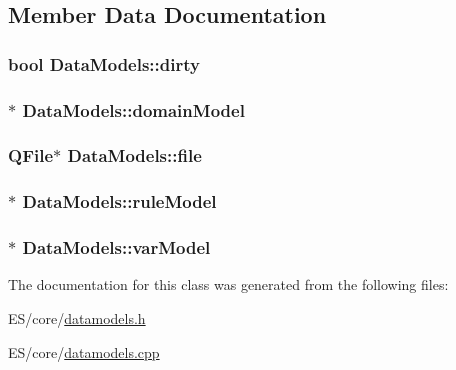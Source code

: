 \subsection{Member Data Documentation}
\hypertarget{class_data_models_a076f7de710bb0fb869f0fb438c7243ab}{
\subsubsection[{dirty}]{\setlength{\rightskip}{0pt plus 5cm}bool {\bf DataModels::dirty}}}
\label{class_data_models_a076f7de710bb0fb869f0fb438c7243ab}
\hypertarget{class_data_models_afb2523926d8919608ed72e8a19374a1f}{
\subsubsection[{domainModel}]{$\ast$ {\bf DataModels::domainModel}}}
\label{class_data_models_afb2523926d8919608ed72e8a19374a1f}
\hypertarget{class_data_models_a85d5d5ca7979b7cea35b9f335ac3faa1}{
\subsubsection[{file}]{\setlength{\rightskip}{0pt plus 5cm}QFile$\ast$ {\bf DataModels::file}}}
\label{class_data_models_a85d5d5ca7979b7cea35b9f335ac3faa1}
\hypertarget{class_data_models_a4d34ba176bffb357f069eec04e46608a}{
\subsubsection[{ruleModel}]{$\ast$ {\bf DataModels::ruleModel}}}
\label{class_data_models_a4d34ba176bffb357f069eec04e46608a}
\hypertarget{class_data_models_a77cae4add4d7d0e8ffe56656ea86fef3}{
\subsubsection[{varModel}]{$\ast$ {\bf DataModels::varModel}}}
\label{class_data_models_a77cae4add4d7d0e8ffe56656ea86fef3}


The documentation for this class was generated from the following files:\begin{DoxyCompactItemize}
\item 
ES/core/\hyperlink{datamodels_8h}{datamodels.h}\item 
ES/core/\hyperlink{datamodels_8cpp}{datamodels.cpp}\end{DoxyCompactItemize}
